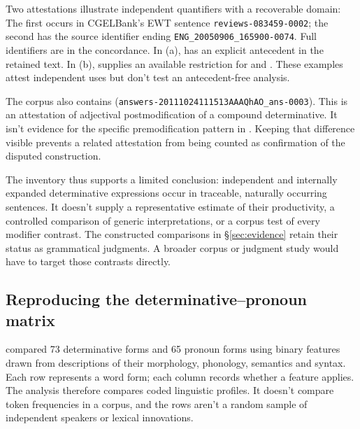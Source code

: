 \documentclass[12pt]{article}
\begin{document}
Two attestations illustrate independent quantifiers with a recoverable domain:
\ea\label{ex:attested-quantifiers}
\ea {}
\ex {}
\z\z
The first occurs in CGELBank's EWT sentence \texttt{reviews-083459-0002}; the second has the source identifier ending \texttt{ENG\_20050906\_165900-0074}. Full identifiers are in the concordance. In (a),  has an explicit antecedent in the retained text. In (b),  supplies an available restriction for  and . These examples attest independent uses but don't test an antecedent-free analysis.

The corpus also contains  (\texttt{answers-20111024111513AAAQhAO\_ans-0003}). This is an attestation of adjectival postmodification of a compound determinative. It isn't evidence for the specific premodification pattern in . Keeping that difference visible prevents a related attestation from being counted as confirmation of the disputed construction.

The inventory thus supports a limited conclusion: independent and internally expanded determinative expressions occur in traceable, naturally occurring sentences. It doesn't supply a representative estimate of their productivity, a controlled comparison of generic interpretations, or a corpus test of every modifier contrast. The constructed comparisons in §\ref{sec:evidence} retain their status as grammatical judgments. A broader corpus or judgment study would have to target those contrasts directly.

\subsection{Reproducing the determinative--pronoun matrix}

\textcite{reynolds2021} compared 73 determinative forms and 65 pronoun forms using binary features drawn from descriptions of their morphology, phonology, semantics and syntax. Each row represents a word form; each column records whether a feature applies. The analysis therefore compares coded linguistic profiles. It doesn't compare token frequencies in a corpus, and the rows aren't a random sample of independent speakers or lexical innovations.
\end{document}
